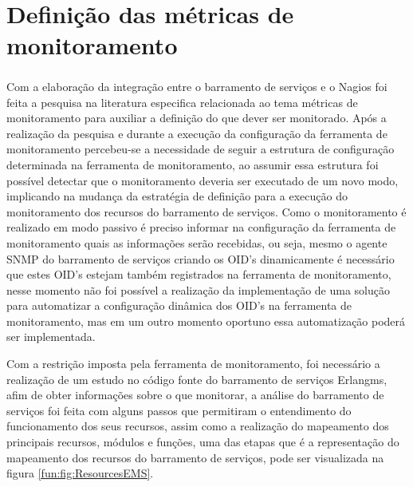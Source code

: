 
\section{Definição das métricas de monitoramento}
\label{metricas_monitoramento}

Com a elaboração da integração entre o barramento de serviços e o Nagios\textsuperscript{\textregistered} foi feita a pesquisa na literatura especifica relacionada ao tema métricas de monitoramento para auxiliar a definição do que dever ser monitorado. Após a realização da pesquisa e durante a execução da configuração da ferramenta de monitoramento percebeu-se a necessidade de seguir a estrutura de configuração determinada na ferramenta de monitoramento, ao assumir essa estrutura foi possível detectar que o monitoramento deveria ser executado de um novo modo, implicando na mudança da estratégia de definição para a execução do monitoramento dos recursos do barramento de serviços. Como o monitoramento é realizado em modo passivo é preciso informar na configuração da ferramenta de monitoramento quais as informações serão recebidas, ou seja, mesmo o agente \acrshort{SNMP} do barramento de serviços criando os \acrshort{OID}'s dinamicamente é necessário que estes \acrshort{OID}'s estejam também registrados na ferramenta de monitoramento, nesse momento  não foi possível a realização da implementação de uma solução para automatizar a configuração dinâmica dos \acrshort{OID}'s na ferramenta de monitoramento, mas em um outro momento oportuno essa automatização poderá ser implementada.

Com a restrição imposta pela ferramenta de monitoramento, foi necessário a realização de um estudo no código fonte do barramento de serviços Erlangms, afim de obter informações sobre o que monitorar, a análise do barramento de serviços foi feita com alguns passos que permitiram o entendimento do funcionamento dos seus recursos, assim como a realização do mapeamento dos principais recursos, módulos e funções, uma das etapas que é a representação do mapeamento dos recursos do barramento de serviços, pode ser visualizada na figura \ref{fun:fig:ResourcesEMS}. 



